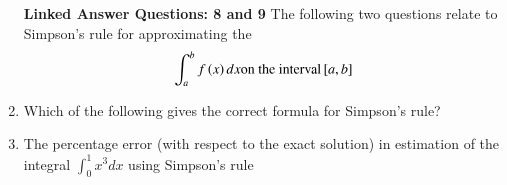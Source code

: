 \documentclass[journal,12pt,onecolumn]{IEEEtran}
\theoremstyle{remark}
\begin{document}
\begin{enumerate}
\textbf{Linked Answer Questions: 8 and 9}
The following two questions relate to Simpson's rule for approximating the \begin{align}
\int_{a}^{b} f\left(x\right) dx \text{on the interval} {}\left[a, b\right]
\end{align}

\item Which of the following gives the correct formula for Simpson's rule?
\begin{enumerate}
\end{enumerate}
\item The percentage error (with respect to the exact solution) in estimation of the integral $\int_{0}^{1} x^{3} dx$ using Simpson's rule 
\begin{enumerate}
\end{enumerate}


\end{enumerate}
\end{document}
